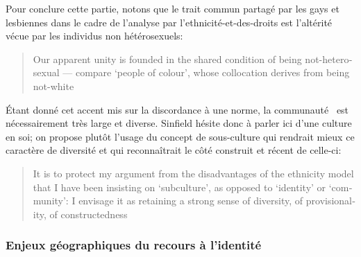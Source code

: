 Pour conclure cette partie, notons que le trait commun partagé par les gays et lesbiennes dans le cadre de l'analyse par l'ethnicité-et-des-droits est l'altérité vécue par les individus non hétérosexuels: \foreignblockquote{english}[{\cite[289]{Sinfield1996}}][.]{Our apparent unity is founded in the shared condition of being not-heterosexual --- compare `people of colour', whose collocation derives from being not-white}. 
Étant donné cet accent mis sur la discordance à une norme, la communauté \lgbt\ est nécessairement très large et diverse. 
Sinfield hésite donc à parler ici d'une culture en soi; on propose plutôt l'usage du concept de sous-culture qui rendrait mieux ce caractère de diversité et qui reconnaîtrait le côté construit et récent de celle-ci:
\foreignblockquote{english}[{\cite[289]{Sinfield1996}}][.]{It is to protect my argument from the disadvantages of the ethnicity model that I have been insisting on `subculture', as opposed to `identity' or `community': I envisage it as retaining a strong sense of diversity, of provisionality, of constructedness}.



\subsubsection{Enjeux géographiques du recours à l'identité}
\label{sec:enjeux_g_ographiques_du_recours_l_identit_} 

